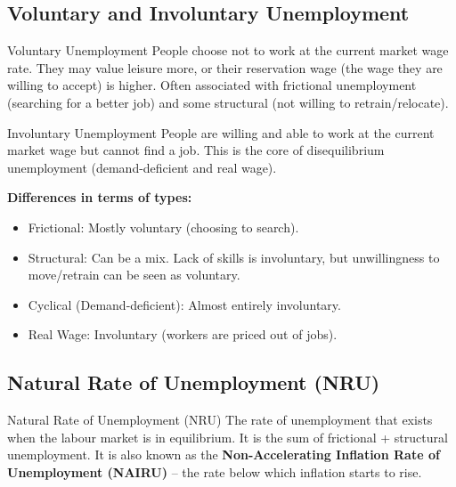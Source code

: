 \documentclass[11pt, a4paper, twoside]{book}
\begin{document}
\subsection{Voluntary and Involuntary Unemployment}

\begin{keyterm}{Voluntary Unemployment}
People choose not to work at the current market wage rate. They may value leisure more, or their reservation wage (the wage they are willing to accept) is higher. Often associated with frictional unemployment (searching for a better job) and some structural (not willing to retrain/relocate).
\end{keyterm}

\begin{keyterm}{Involuntary Unemployment}
People are willing and able to work at the current market wage but cannot find a job. This is the core of disequilibrium unemployment (demand-deficient and real wage).
\end{keyterm}

\textbf{Differences in terms of types:}
\begin{itemize}
  \item Frictional: Mostly voluntary (choosing to search).
  \item Structural: Can be a mix. Lack of skills is involuntary, but unwillingness to move/retrain can be seen as voluntary.
  \item Cyclical (Demand-deficient): Almost entirely involuntary.
  \item Real Wage: Involuntary (workers are priced out of jobs).
\end{itemize}

\subsection{Natural Rate of Unemployment (NRU)}

\begin{keyterm}{Natural Rate of Unemployment (NRU)}
The rate of unemployment that exists when the labour market is in equilibrium. It is the sum of frictional + structural unemployment. It is also known as the \textbf{Non-Accelerating Inflation Rate of Unemployment (NAIRU)} -- the rate below which inflation starts to rise.
\end{keyterm}
\end{document}
